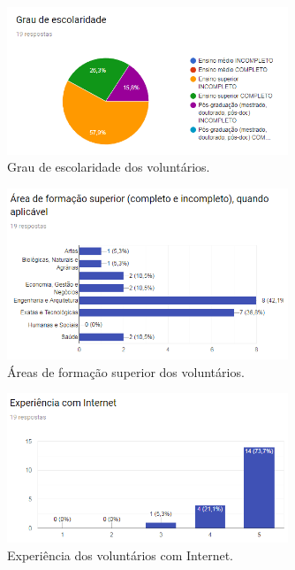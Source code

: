 \begin{figure}[h]
    \caption{Grau de escolaridade dos voluntários.}
       	\begin{center}
            \includegraphics[width=0.75\textwidth]{figuras/avaliacao/escolaridade.png}
        \end{center}
    \label{avalGrafEscolaridade}
\end{figure} 

\begin{figure}[H]
    \caption{Áreas de formação superior dos voluntários.}
       	\begin{center}
            \includegraphics[width=0.75\textwidth]{figuras/avaliacao/area-formacao.png}
        \end{center}
    \label{avalGrafAreasAtuacao}
\end{figure} 

\begin{figure}[h]
    \caption{Experiência dos voluntários com Internet.}
       	\begin{center}
            \includegraphics[width=0.75\textwidth]{figuras/avaliacao/xp-internet.png}
        \end{center}
    \label{avalGrafInternet}
\end{figure} 

